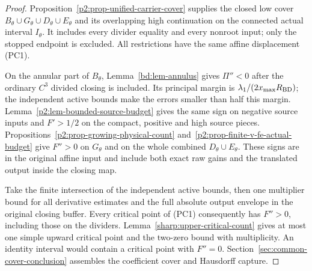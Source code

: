 \begin{proof}
Proposition~\ref{p2:prop-unified-carrier-cover} supplies the closed
low cover $B_\theta\cup G_\theta\cup D_\theta\cup E_\theta$ and
its overlapping high continuation on the connected actual interval
$I_\theta$. It includes every divider equality and every nonroot input;
only the stopped endpoint is excluded.
All restrictions have the same affine displacement (PC1).

On the annular part of $B_\theta$,
Lemma~\ref{bd:lem-annulus} gives $\Pi''<0$ after the ordinary
$C^3$ divided closing is included. Its principal margin is
$\lambda_1/(2x_{\max}R_{\rm BD})$; the independent active bounds
make the errors smaller than half this margin.
Lemma~\ref{p2:lem-bounded-source-budget} gives the same sign on
negative source inputs and $F'>1/2$ on the compact, positive and
high source pieces. Propositions~\ref{p2:prop-growing-physical-count}
and~\ref{p2:prop-finite-v-fe-actual-budget} give $F''>0$ on
$G_\theta$ and on the whole combined $D_\theta\cup E_\theta$.
These signs are in the original affine input and include both exact
raw gains and the translated output inside the closing map.

Take the finite intersection of the independent active bounds, then
one multiplier bound for all derivative estimates and the full absolute
output envelope in the original closing buffer. Every critical point
of (PC1) consequently has $F''>0$, including those on the dividers.
Lemma~\ref{sharp:upper-critical-count} gives at most one simple
upward critical point and the two-zero bound with multiplicity.
An identity interval would contain a critical point with $F''=0$.
Section~\ref{sec:common-cover-conclusion} assembles the coefficient
cover and Hausdorff capture.
\end{proof}
